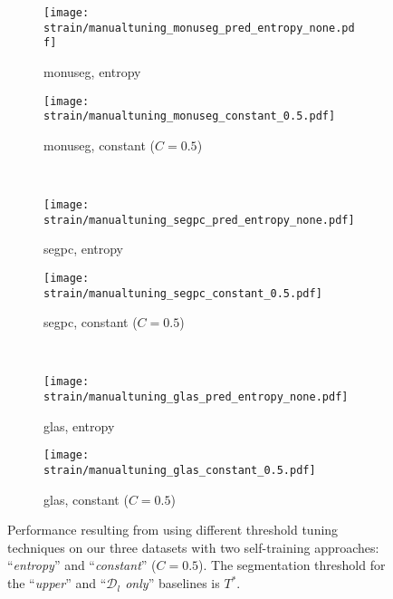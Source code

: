 \begin{figure}
  \centering
  \begin{subfigure}{0.48\textwidth}
    \centering
    \texttt{[image: strain/manualtuning\_monuseg\_pred\_entropy\_none.pdf]}
    \caption{\acrshort{monuseg}, entropy}
    \label{sfig:strain:manual:monu_entropy}
  \end{subfigure}
  \begin{subfigure}{0.48\textwidth}
    \centering
    \texttt{[image: strain/manualtuning\_monuseg\_constant\_0.5.pdf]}
    \caption{\acrshort{monuseg}, constant ($C=0.5$)}
    \label{sfig:strain:manual:monu_constant}
  \end{subfigure} \\
  \begin{subfigure}{0.48\textwidth}
    \centering
    \texttt{[image: strain/manualtuning\_segpc\_pred\_entropy\_none.pdf]}
    \caption{\acrshort{segpc}, entropy}
    \label{sfig:strain:manual:_segpc_pred_entropy_none}
  \end{subfigure}
  \begin{subfigure}{0.48\textwidth}
    \centering
    \texttt{[image: strain/manualtuning\_segpc\_constant\_0.5.pdf]}
    \caption{\acrshort{segpc}, constant ($C=0.5$)}
    \label{sfig:strain:manual:_segpc_constant}
  \end{subfigure} \\
  \begin{subfigure}{0.48\textwidth}
    \centering
    \texttt{[image: strain/manualtuning\_glas\_pred\_entropy\_none.pdf]}
    \caption{\acrshort{glas}, entropy}
    \label{sfig:strain:manual:_glas_pred_entropy_none}
  \end{subfigure}
  \begin{subfigure}{0.48\textwidth}
    \centering
    \texttt{[image: strain/manualtuning\_glas\_constant\_0.5.pdf]}
    \caption{\acrshort{glas}, constant ($C=0.5$)}
    \label{sfig:strain:manual:_glas_constant}
  \end{subfigure} 
  \caption{Performance resulting from using different threshold tuning techniques on our three datasets with two self-training approaches: ``\textit{entropy}'' and ``\textit{constant}'' ($C=0.5$). The segmentation threshold for the ``\textit{upper}'' and ``\textit{$\mathcal{D}_l$ only}'' baselines is $T^*$.}
  \label{fig:strain:manualtuning}
\end{figure}


